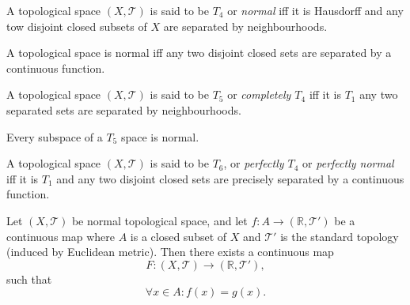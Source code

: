 \begin{definition}
	[$T_4$ spaces]
	\label{def: T_4 spaces}
	A topological space $(X, \mathcal T)$ is said to be $T_4$ or \textit{normal} iff it is Hausdorff and any tow disjoint closed subsets of $X$ are separated by neighbourhoods.
\end{definition}


\begin{proposition}
	\label{prop: urysohn's lemma}
	A topological space is normal iff any two disjoint closed sets are separated by a continuous function.
\end{proposition}


\begin{definition}
	[$T_5$ spaces]
	\label{def: T_5 spaces}
	A topological space $(X, \mathcal T)$ is said to be $T_5$ or \textit{completely $T_4$} iff it is $T_1$ any two separated sets are separated by neighbourhoods.
\end{definition}


\begin{proposition}
	Every subspace of a $T_5$ space is normal.
\end{proposition}


\begin{definition}
	[$T_6$ spaces]
	\label{def: T_6 spaces}
	A topological space $(X, \mathcal T)$ is said to be $T_6$, or \textit{perfectly $T_4$} or \textit{perfectly normal} iff it is $T_1$ and any two disjoint closed sets are precisely separated by a continuous function.
\end{definition}



\begin{proposition}
	\label{prop: Tietze extension theorem}
	Let $(X, \mathcal T)$ be normal topological space, and let $f: A \to (\mathbb R, \mathcal T')$ be a continuous map where $A$ is a closed subset of $X$ and $\mathcal T'$ is the standard topology (induced by Euclidean metric). Then there exists a continuous map
	$$
	F: (X, \mathcal T) \to (\mathbb R, \mathcal T'),
	$$
	such that
	$$
	\forall x \in A: f(x) = g(x).
	$$
\end{proposition}

